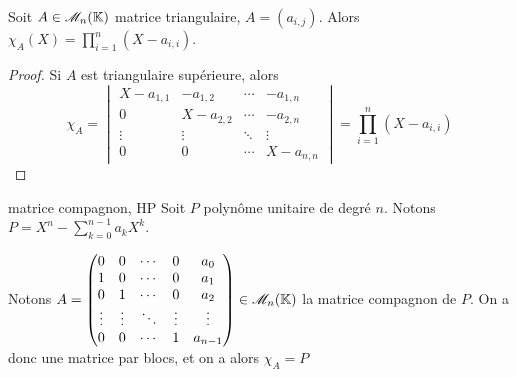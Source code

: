 \begin{proposition}{}{}
    Soit $A \in \mathscr M_n (\mathbb{K})$ matrice triangulaire, $A = (a_{i, j})$. Alors 
    $\displaystyle \chi_A(X) = \prod_{i = 1 }^{ n } (X - a_{i, i})$.
\end{proposition}

\begin{proof}
    Si $A$ est triangulaire supérieure, alors 
    $$\chi_A = \begin{vmatrix}
        X - a_{1, 1} & -a_{1, 2} & \cdots & -a_{1, n} \\
        0 & X - a_{2, 2} & \cdots & -a_{2, n} \\
        \vdots & \vdots & \ddots & \vdots \\
        0 & 0 & \cdots & X - a_{n, n}
    \end{vmatrix} = \prod_{i = 1 }^{ n } (X - a_{i, i})$$
\end{proof}

\begin{definition}{matrice compagnon, HP}{}
    Soit $P$ polynôme unitaire de degré $n$. Notons 
    $\displaystyle P = X^n - \sum_{k = 0 }^{n - 1} a_k X^k$.

    Notons $A = \begin{pmatrix}
        0 & 0 & \cdots & 0 & a_0 \\
        1 & 0 & \cdots & 0 & a_1 \\
        0 & 1 & \cdots & 0 & a_2 \\
        \vdots & \vdots & \ddots & \vdots & \vdots \\
        0 & 0 & \cdots & 1 & a_{n - 1}
    \end{pmatrix} \in \mathscr M_n(\mathbb{K})$ la matrice compagnon de $P$. On a donc une matrice par blocs, 
    et on a alors $\chi_A = P$

\end{definition}


